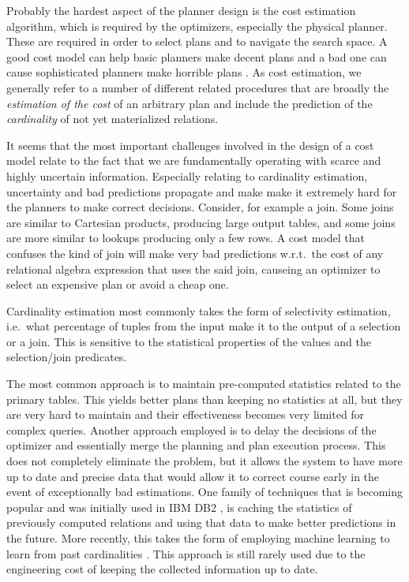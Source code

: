 Probably the hardest aspect of the planner design is the cost
estimation algorithm, which is required by the optimizers, especially
the physical planner. These are required in order to select plans and
to navigate the search space. A good cost model can help basic
planners make decent plans and a bad one can cause sophisticated
planners make horrible plans \cite{leisHowGoodAre2015}. As cost
estimation, we generally refer to a number of different related
procedures that are broadly the \emph{estimation of the cost} of an
arbitrary plan and include the prediction of the \emph{cardinality} of
not yet materialized relations.

It seems that the most important challenges involved in the design of
a cost model relate to the fact that we are fundamentally operating
with scarce and highly uncertain information. Especially relating to
cardinality estimation, uncertainty and bad predictions propagate and
make make it extremely hard for the planners to make correct
decisions. Consider, for example a join. Some joins are similar to
Cartesian products, producing large output tables, and some joins are
more similar to lookups producing only a few rows. A cost model that
confuses the kind of join will make very bad predictions w.r.t.\ the
cost of any relational algebra expression that uses the said join,
causeing an optimizer to select an expensive plan or avoid a cheap
one.

Cardinality estimation most commonly takes the form of selectivity
estimation, i.e.\ what percentage of tuples from the input make it to
the output of a selection or a join. This is sensitive to the
statistical properties of the values and the selection/join
predicates.

The most common approach is to maintain pre-computed statistics
related to the primary tables. This yields better plans than keeping
no statistics at all, but they are very hard to maintain and their
effectiveness becomes very limited for complex queries. Another
approach employed is to delay the decisions of the optimizer and
essentially merge the planning and plan execution process. This does
not completely eliminate the problem, but it allows the system to have
more up to date and precise data that would allow it to correct course
early in the event of exceptionally bad estimations. One family of
techniques that is becoming popular and was initially used in IBM DB2
\cite{stillgerLEODB2LearningOptimizer2001}, is caching the statistics
of previously computed relations and using that data to make better
predictions in the future. More recently, this takes the form of
employing machine learning to learn from past cardinalities
\cite{ortizEmpiricalAnalysisDeep2019}. This approach is still rarely
used due to the engineering cost of keeping the collected information
up to date.

